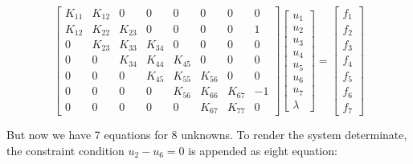 \begin{equation}
    \begin{bmatrix}
        K_{11} & K_{12} & 0 & 0 & 0 & 0 & 0 & 0 \\
        K_{12} & K_{22} & K_{23} & 0 & 0 & 0 & 0 & 1 \\
        0 & K_{23} & K_{33} & K_{34} & 0 & 0 & 0 & 0 \\
        0 & 0 & K_{34} & K_{44} & K_{45} & 0 & 0 & 0 \\
        0 & 0 & 0 & K_{45} & K_{55} & K_{56} & 0 & 0 \\
        0 & 0 & 0 & 0 & K_{56} & K_{66} & K_{67} & -1 \\
        0 & 0 & 0 & 0 & 0 & K_{67} & K_{77} & 0
    \end{bmatrix}
    \begin{bmatrix}
        u_1 \\
        u_2 \\
        u_3 \\
        u_4 \\
        u_5 \\
        u_6 \\
        u_7 \\
        \lambda
    \end{bmatrix}
    = \begin{bmatrix}
        f_1 \\
        f_2 \\
        f_3 \\
        f_4 \\
        f_5 \\
        f_6 \\
        f_7
    \end{bmatrix}
\end{equation}

But now we have 7 equations for 8 unknowns. To render the system determinate, the
constraint condition $ u_2 - u_6 = 0 $ is appended as eight equation:

